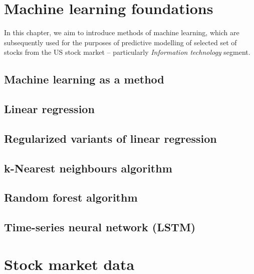 \chapter{Machine learning foundations}

In this chapter, we aim to introduce methods of machine learning, which
are subsequently used for the purposes of predictive modelling of selected
set of stocks from the US stock market – particularly \textit{Information technology} segment.

\section{Machine learning as a method}

\section{Linear regression}

\section{Regularized variants of linear regression}

\section{k-Nearest neighbours algorithm}

\section{Random forest algorithm}

\section{Time-series neural network (LSTM)}


\chapter{Stock market data}

